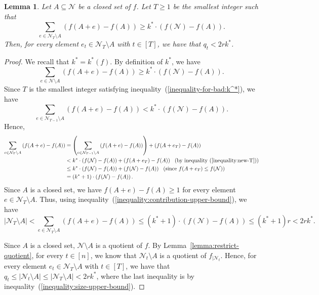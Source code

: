 \documentclass[11pt]{article}
\newtheorem{lemma}{Lemma}
\theoremstyle{definition}
\begin{document}
\begin{lemma}\label{lemma:q_t-upper-bound}
    Let $A\subseteq \mathcal{N}$ be a closed set of $f$. Let $T\geq 1$ be the smallest integer such that
    \begin{equation}\label{inequality-for-bad:k^*}
    \sum_{e\in \mathcal{N}_T\setminus A} \left(f(A+e)-f(A)\right) \geq k^*\cdot \left(f(\mathcal{N})-f(A)\right).
    \end{equation}
    Then, for every element $e_t\in \mathcal{N}_T\setminus A$ with $t\in [T]$, we have that $q_t<2rk^*$. 
\end{lemma}
\begin{proof}
We recall that $k^*=k^*(f)$. By definition of $k^*$, we have
    $$
    \sum_{e\in \mathcal{N}\setminus A} \left(f(A+e)-f(A)\right) \geq k^*\cdot \left(f(\mathcal{N})-f(A)\right).
    $$
    Since $T$ is the smallest integer satisfying inequality~(\ref{inequality-for-bad:k^*}), we have
    \begin{equation}\label{inequality:new-T}
        \sum_{e\in \mathcal{N}_{T-1}\setminus A} \left(f(A+e)-f(A)\right) < k^*\cdot \left(f(\mathcal{N})-f(A)\right).
    \end{equation}
    Hence,
    \begin{align}\label{inequality:contribution-upper-bound}
        \sum_{e\in \mathcal{N}_T\setminus A} \left(f(A+e)-f(A)\right) &= \left(\sum_{e\in \mathcal{N}_{T-1}\setminus A} \left(f(A+e)-f(A)\right)\right)+\left(f(A+e_{T})-f(A)\right) \notag \\
        &< k^*\cdot \left(f(\mathcal{N})-f(A)\right)+\left(f(A+e_{T})-f(A)\right) \ \ \text{(by inequality~(\ref{inequality:new-T}))} \notag \\
        &\leq k^*\cdot \left(f(\mathcal{N})-f(A)\right)+\left(f(\mathcal{N})-f(A)\right) \ \ \text{(since $f(A+e_T)\leq f(\mathcal{N})$)} \notag \\
        &= (k^*+1)\cdot \left(f(\mathcal{N})-f(A)\right).
    \end{align}
    Since $A$ is a closed set, we have $f(A+e)-f(A)\geq 1$ for every element $e\in \mathcal{N}_T\setminus A$. Thus, using inequality~(\ref{inequality:contribution-upper-bound}), we have
    \begin{equation}\label{inequality:size-upper-bound}
        |\mathcal{N}_T\setminus A| < \sum_{e\in \mathcal{N}_T\setminus A} \left(f(A+e)-f(A)\right) \leq (k^*+1)\cdot (f(\mathcal{N})-f(A)) \leq (k^*+1)r <2rk^*.
    \end{equation}
    
    Since $A$ is a closed set, $\mathcal{N}\setminus A$ is a quotient of $f$. By Lemma~\ref{lemma:restrict-quotient}, for every $t\in [n]$, we know that $\mathcal{N}_t\setminus A$ is a quotient of $f_{|\mathcal{N}_t}$. Hence, for every element $e_t\in \mathcal{N}_T\setminus A$ with $t\in [T]$, we have that $q_t\leq |\mathcal{N}_t\setminus A|\leq |\mathcal{N}_T\setminus A|<2rk^*$, where the last inequality is by inequality~(\ref{inequality:size-upper-bound}).
\end{proof}
\end{document}
